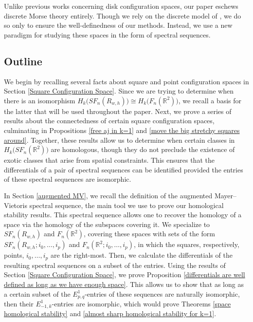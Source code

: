 \documentclass[pagebackref,colorlinks,citecolor=blue,linkcolor=blue,urlcolor=blue,filecolor=blue]{article}
\theoremstyle{definition}\newtheorem{definition}[thm]{Definition}
\theoremstyle{definition}
\newcommand{\R}{\ensuremath{\mathbb{R}}}
\begin{document}
Unlike previous works concerning disk configuration spaces, our paper eschews discrete Morse theory entirely. 
Though we rely on the discrete model of \cite{alpert2023homology}, we do so only to ensure the well-definedness of our methods.
Instead, we use a new paradigm for studying these spaces in the form of spectral sequences.

\subsection{Outline}
We begin by recalling several facts about square and point configuration spaces in Section \ref{Square Configuration Space}.
Since we are trying to determine when there is an isomorphism $H_{k}\big(SF_{n}(R_{w, h})\big)\cong H_{k}\big(F_{n}(\R^{2})\big)$, we recall a basis for the latter that will be used throughout the paper.
Next, we prove a series of results about the connectedness of certain square configuration spaces, culminating in Propositions \ref{free aj in k=1} and \ref{move the big stretchy squares around}.
Together, these results allow us to determine when certain classes in $H_{k}\big(SF_{n}(\R^{2})\big)$ are homologous, though they do not preclude the existence of exotic classes that arise from spatial constraints.
This ensures that the differentials of a pair of spectral sequences can be identified provided the entries of these spectral sequences are isomorphic.

In Section \ref{augmented MV}, we recall the definition of the augmented Mayer--Vietoris spectral sequence, the main tool we use to prove our homological stability results.
This spectral sequence allows one to recover the homology of a space via the homology of the subspaces covering it.
We specialize to $SF_{n}(R_{w,h})$ and $F_{n}(\R^{2})$, covering these spaces with sets of the form $SF_{n}(R_{w,h}; i_{0}, \dots, i_{p})$ and $F_{n}(\R^{2}; i_{0}, \dots, i_{p})$, in which the squares, respectively, points, $i_{0}, \dots, i_{p}$ are the right-most.
Then, we calculate the differentials of the resulting spectral sequences on a subset of the entries.
Using the results of Section \ref{Square Configuration Space}, we prove Proposition \ref{differentials are well defined as long as we have enough space}.
This allows us to show that as long as a certain subset of the $E^{1}_{p,q}$-entries of these sequences are naturally isomorphic, then their $E^{1}_{-1,k}$-entries are isomorphic, which would prove Theorems \ref{space homological stability} and \ref{almost sharp homological stability for k=1}.
\end{document}
